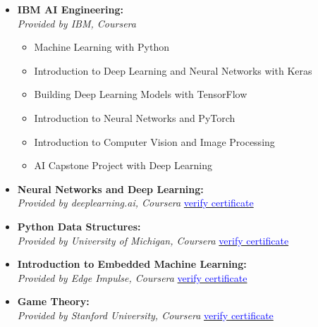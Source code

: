 \documentclass[12pt]{article}
\begin{document}
\begin{itemize}
		\vspace{8pt}
	\item \textbf{IBM AI Engineering:} \\
	\textit{Provided by IBM, Coursera}
	\begin{itemize}
		\item Machine Learning with Python
		\item Introduction to Deep Learning and Neural Networks with Keras
		\item Building Deep Learning Models with TensorFlow
		\item Introduction to Neural Networks and PyTorch
		\item Introduction to Computer Vision and Image Processing
		\item AI Capstone Project with Deep Learning
	\end{itemize}
	\item \textbf{Neural Networks and Deep Learning:} \\
	\textit{Provided by deeplearning.ai, Coursera} \hfill
	\href{https://coursera.org/share/8d9110917e9443857718534087a51190}{\textcolor{blue}{verify certificate}}
	\vspace{8pt}
	\item \textbf{Python Data Structures:} \\
	\textit{Provided by University of Michigan, Coursera} \hfill
	\href{https://coursera.org/share/8944f2b056a3405c606e509e61f5570e}{\textcolor{blue}{verify certificate}}
	\vspace{8pt}
	\item \textbf{Introduction to Embedded Machine Learning:} \\
	\textit{Provided by Edge Impulse, Coursera} \hfill
	\href{https://coursera.org/share/0b709e9d6305db689ca5018f1531f4ef}{\textcolor{blue}{verify certificate}}
	\vspace{8pt}
	\item \textbf{Game Theory:} \\
	\textit{Provided by Stanford University, Coursera} \hfill
	\href{https://coursera.org/share/7c342a051890483df7748d65ad0113c2}{\textcolor{blue}{verify certificate}}
\end{itemize}
\end{document}

